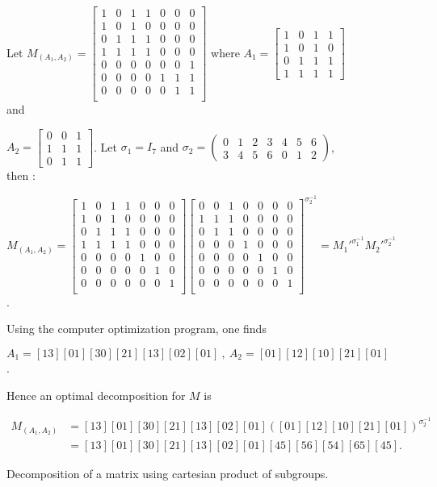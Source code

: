 \documentclass[a4paper,12pt,fleqn]{article}
\begin{document}
 
\begin{figure}[h]
Let $M_{(A_1,A_2)}=\begin{bmatrix}
   1&0&1&1&0&0&0\\
   1&0&1&0&0&0&0\\
   0&1&1&1&0&0&0\\
   1&1&1&1&0&0&0\\
   0&0&0&0&0&0&1\\
   0&0&0&0&1&1&1\\
   0&0&0&0&0&1&1\\
 \end{bmatrix}$
 where $A_1=\begin{bmatrix}
   1&0&1&1\\
   1&0&1&0\\
   0&1&1&1\\
   1&1&1&1
 \end{bmatrix}$ and
 
 $A_2=\begin{bmatrix}
   0&0&1\\
   1&1&1\\
   0&1&1
 \end{bmatrix}$.
  Let $\sigma_1=I_7$ and
 $\sigma_2=\begin{pmatrix}0&1&2&3&4&5&6\\3&4&5&6&0&1&2\end{pmatrix}$,
 then :

 $M_{(A_1,A_2)}=\begin{bmatrix}
   1&0&1&1&0&0&0\\
   1&0&1&0&0&0&0\\
   0&1&1&1&0&0&0\\
   1&1&1&1&0&0&0\\
   0&0&0&0&1&0&0\\
   0&0&0&0&0&1&0\\
   0&0&0&0&0&0&1\\
 \end{bmatrix}
 \begin{bmatrix}
   0&0&1&0&0&0&0\\
   1&1&1&0&0&0&0\\
   0&1&1&0&0&0&0\\
   0&0&0&1&0&0&0\\
   0&0&0&0&1&0&0\\
   0&0&0&0&0&1&0\\
   0&0&0&0&0&0&1\\
 \end{bmatrix}^{\sigma_2^{-1}}={M_1'}^{\sigma_1^{-1}}{M_2'}^{\sigma_2^{-1}}$.

Using the computer optimization program, one finds 

 $A_1=[13][01][30][21][13][02][01]\ ,\ A_2=[01][12][10][21][01]$.

 Hence an optimal decomposition for $M$ is 

$\begin{array}{ll}
M_{(A_1,A_2)}&=[13][01][30][21][13][02][01]([01][12][10][21][01])^{\sigma_2^{-1}}\\
             &=[13][01][30][21][13][02][01][45][56][54][65][45].
\end{array}$
 
{ \caption{ Decomposition of a matrix using cartesian product of subgroups.\label{cart1}}}
  \end{figure}
\end{document}
